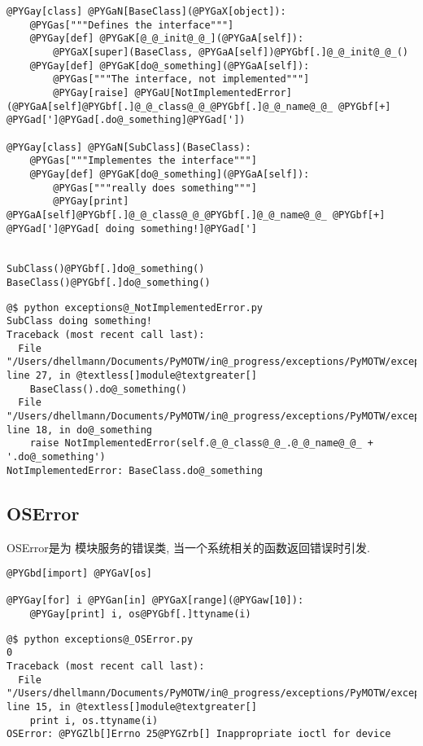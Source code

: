\documentclass[a4paper,10pt,english]{manual}
\begin{document}
\begin{Verbatim}[commandchars=@\[\]]
@PYGay[class] @PYGaN[BaseClass](@PYGaX[object]):
    @PYGas["""Defines the interface"""]
    @PYGay[def] @PYGaK[@_@_init@_@_](@PYGaA[self]):
        @PYGaX[super](BaseClass, @PYGaA[self])@PYGbf[.]@_@_init@_@_()
    @PYGay[def] @PYGaK[do@_something](@PYGaA[self]):
        @PYGas["""The interface, not implemented"""]
        @PYGay[raise] @PYGaU[NotImplementedError](@PYGaA[self]@PYGbf[.]@_@_class@_@_@PYGbf[.]@_@_name@_@_ @PYGbf[+] @PYGad[']@PYGad[.do@_something]@PYGad['])

@PYGay[class] @PYGaN[SubClass](BaseClass):
    @PYGas["""Implementes the interface"""]
    @PYGay[def] @PYGaK[do@_something](@PYGaA[self]):
        @PYGas["""really does something"""]
        @PYGay[print] @PYGaA[self]@PYGbf[.]@_@_class@_@_@PYGbf[.]@_@_name@_@_ @PYGbf[+] @PYGad[']@PYGad[ doing something!]@PYGad[']


SubClass()@PYGbf[.]do@_something()
BaseClass()@PYGbf[.]do@_something()
\end{Verbatim}

\begin{Verbatim}[commandchars=@\[\]]
@$ python exceptions@_NotImplementedError.py
SubClass doing something!
Traceback (most recent call last):
  File "/Users/dhellmann/Documents/PyMOTW/in@_progress/exceptions/PyMOTW/exceptions/exceptions@_NotImplementedError.py", line 27, in @textless[]module@textgreater[]
    BaseClass().do@_something()
  File "/Users/dhellmann/Documents/PyMOTW/in@_progress/exceptions/PyMOTW/exceptions/exceptions@_NotImplementedError.py", line 18, in do@_something
    raise NotImplementedError(self.@_@_class@_@_.@_@_name@_@_ + '.do@_something')
NotImplementedError: BaseClass.do@_something
\end{Verbatim}


\subsection{OSError}

OSError是为  模块服务的错误类, 当一个系统相关的函数返回错误时引发.

\begin{Verbatim}[commandchars=@\[\]]
@PYGbd[import] @PYGaV[os]

@PYGay[for] i @PYGan[in] @PYGaX[range](@PYGaw[10]):
    @PYGay[print] i, os@PYGbf[.]ttyname(i)
\end{Verbatim}

\begin{Verbatim}[commandchars=@\[\]]
@$ python exceptions@_OSError.py
0
Traceback (most recent call last):
  File "/Users/dhellmann/Documents/PyMOTW/in@_progress/exceptions/PyMOTW/exceptions/exceptions@_OSError.py", line 15, in @textless[]module@textgreater[]
    print i, os.ttyname(i)
OSError: @PYGZlb[]Errno 25@PYGZrb[] Inappropriate ioctl for device
\end{Verbatim}
\end{document}
